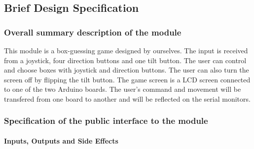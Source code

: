 \subsection{Brief Design Specification}
\subsubsection{Overall summary description of the module}
This module is a box-guessing game designed by ourselves. The input is received from a joystick, four direction buttons and one tilt button. The user can control and choose boxes with joystick and direction buttons. The user can also turn the screen off by flipping the tilt button. The game screen is a LCD screen connected to one of the two Arduino boards. The user's command and movement will be transfered from one board to another and will be reflected on the serial monitors.

\subsubsection{Specification of the public interface to the module}
\paragraph{Inputs, Outputs and Side Effects}